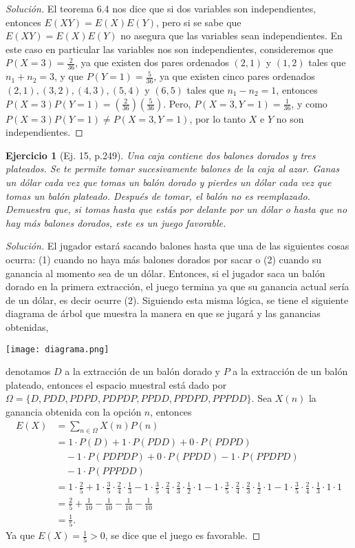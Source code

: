 \documentclass[12pt,letterpaper]{article}
\newtheorem{ej}{Ejercicio}
\begin{document}
\begin{proof}[Solución]
El teorema 6.4 nos dice que si dos variables son independientes, entonces $E(XY)=E(X)E(Y)$, pero si se sabe que $E(XY)=E(X)E(Y)$ no asegura que las variables sean independientes. En este caso en particular las variables nos son independientes, consideremos que $P(X=3)=\frac{2}{36}$, ya que existen dos pares ordenados $(2,1)$ y $(1,2)$ tales que $n_1+n_2 =3$, y que $P(Y=1)=\frac{5}{36}$, ya que existen cinco pares ordenados $(2,1), (3,2), (4,3), (5,4)$ y $(6,5)$ tales que $n_1 - n_2 = 1$, entonces $P(X=3)P(Y=1)=(\frac{2}{36})(\frac{5}{36})$. Pero, $P(X=3,Y=1)=\frac{1}{36}$, y como $P(X=3)P(Y=1)\neq P(X=3,Y=1)$, por lo tanto $X$ e $Y$ no son independientes.
\end{proof}

\begin{ej}[Ej. 15, p.249]
Una caja contiene dos balones dorados y tres plateados. Se te permite tomar sucesivamente balones de la caja al azar. Ganas un dólar cada vez que tomas un balón dorado y pierdes un dólar cada vez que tomas un balón plateado. Después de tomar, el balón no es reemplazado. Demuestra que, si tomas hasta que estás por delante por un dólar o hasta que no hay más balones dorados, este es un juego favorable.
\end{ej}

\begin{proof}[Solución] El jugador estará sacando balones hasta que una de las siguientes cosas ocurra: (1) cuando no haya más balones dorados por sacar o (2) cuando su ganancia al momento sea de un dólar. Entonces, si el jugador saca un balón dorado en la primera extracción, el juego termina ya que su ganancia actual sería de un dólar, es decir ocurre (2). Siguiendo esta misma lógica, se tiene el siguiente diagrama de árbol que muestra la manera en que se jugará y las ganancias obtenidas,
\begin{center}
\texttt{[image: diagrama.png]}
\end{center}
denotamos $D$ a la extracción de un balón dorado y $P$ a la extracción de un balón plateado, entonces el espacio muestral está dado por $\Omega= \{ D, PDD, PDPD, PDPDP, PPDD, PPDPD, PPPDD\}$. Sea $X(n)$ la ganancia obtenida con la opción $n$, entonces
\begin{align*}
E(X)&= \sum_{n \in \Omega} X(n)P(n)\\
&= 1 \cdot P(D) + 1 \cdot P(PDD)+ 0 \cdot P(PDPD) \\&\quad -1 \cdot P(PDPDP) + 0 \cdot P(PPDD) -1 \cdot P(PPDPD) \\& \quad -1 \cdot P(PPPDD) \\ &= 1 \cdot \frac{2}{5} + 1 \cdot \frac{3}{5} \cdot \frac{2}{4} \cdot \frac{1}{3} -1 \cdot \frac{3}{5} \cdot \frac{2}{4} \cdot \frac{2}{3} \cdot \frac{1}{2} \cdot 1 -1\cdot \frac{3}{5} \cdot \frac{2}{4} \cdot \frac{2}{3} \cdot \frac{1}{2} \cdot 1 - 1 \cdot \frac{3}{5} \cdot \frac{2}{4} \cdot \frac{1}{3} \cdot 1\cdot 1 \\ &= \frac{2}{5} + \frac{1}{10} - \frac{1}{10} - \frac{1}{10} - \frac{1}{10} \\&= \frac{1}{5}.
\end{align*}
Ya que $E(X)=\frac{1}{5} > 0$, se dice que el juego es favorable.
\end{proof}
\end{document}
